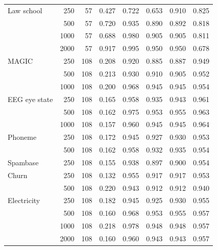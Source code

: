 \documentclass[pdflatex,sn-mathphys-num,iicol]{sn-jnl}
\theoremstyle{thmstyleone}
\theoremstyle{thmstyletwo}
\theoremstyle{thmstylethree}
\begin{document}
\begin{table}[t]
{\begin{tabular}{lrr rrrr r}
\addlinespace
Law school & 250 & 57 & 0.427 & 0.722 & 0.653 & 0.910 & 0.825 \\
 & 500 & 57 & 0.720 & 0.935 & 0.890 & 0.892 & 0.818 \\
 & 1000 & 57 & 0.688 & 0.980 & 0.905 & 0.905 & 0.811 \\
 & 2000 & 57 & 0.917 & 0.995 & 0.950 & 0.950 & 0.678 \\
\addlinespace
MAGIC & 250 & 108 & 0.208 & 0.920 & 0.885 & 0.887 & 0.949 \\
 & 500 & 108 & 0.213 & 0.930 & 0.910 & 0.905 & 0.952 \\
 & 1000 & 108 & 0.200 & 0.968 & 0.945 & 0.945 & 0.954 \\
\addlinespace
EEG eye state & 250 & 108 & 0.165 & 0.958 & 0.935 & 0.943 & 0.961 \\
 & 500 & 108 & 0.162 & 0.975 & 0.953 & 0.955 & 0.963 \\
 & 1000 & 108 & 0.157 & 0.960 & 0.945 & 0.945 & 0.964 \\
\addlinespace
Phoneme & 250 & 108 & 0.172 & 0.945 & 0.927 & 0.930 & 0.953 \\
 & 500 & 108 & 0.162 & 0.958 & 0.932 & 0.935 & 0.954 \\
\addlinespace
Spambase & 250 & 108 & 0.155 & 0.938 & 0.897 & 0.900 & 0.954 \\
\addlinespace
Churn & 250 & 108 & 0.132 & 0.955 & 0.917 & 0.917 & 0.953 \\
 & 500 & 108 & 0.220 & 0.943 & 0.912 & 0.912 & 0.940 \\
\addlinespace
Electricity & 250 & 108 & 0.182 & 0.945 & 0.925 & 0.930 & 0.955 \\
 & 500 & 108 & 0.160 & 0.968 & 0.953 & 0.955 & 0.957 \\
 & 1000 & 108 & 0.218 & 0.978 & 0.948 & 0.948 & 0.957 \\
 & 2000 & 108 & 0.160 & 0.960 & 0.943 & 0.943 & 0.957 \\
\bottomrule\end{tabular}}

\end{table}
\end{document}
